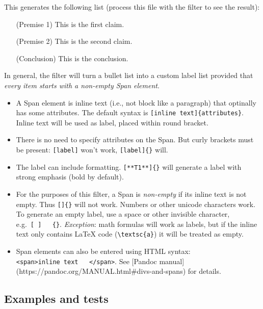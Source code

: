 This generates the following list (process this file with the filter to
see the result):

\begin{itemize}
\tightlist

\item[(Premise 1)] This is the first claim.

\item[(Premise 2)] This is the second claim.

\item[(Conclusion)] This is the conclusion.

\end{itemize}

In general, the filter will turn a bullet list into a custom label list
provided that \emph{every item starts with a non-empty Span element}.

\begin{itemize}
\tightlist
\item
  A Span element is inline text (i.e., not block like a paragraph) that
  optinally has some attributes. The default syntax is
  \texttt{{[}inline\ text{]}\{attributes\}}. Inline text will be used as
  label, placed within round bracket.
\item
  There is no need to specify attributes on the Span. But curly brackets
  must be present: \texttt{{[}label{]}} won't work,
  \texttt{{[}label{]}\{\}} will.
\item
  The label can include formatting. \texttt{{[}**T1**{]}\{\}} will
  generate a label with strong emphasis (bold by default).
\item
  For the purposes of this filter, a Span is \emph{non-empty} if its
  inline text is not empty. Thus \texttt{{[}{]}\{\}} will not work.
  Numbers or other unicode characters work. To generate an empty label,
  use a space or other invisible character,
  e.g.~\texttt{{[}\ {]}\ \ \ \{\}}. \emph{Exception}: math formulas will
  work as labels, but if the inline text only contains LaTeX code
  (\texttt{\textbackslash{}textsc\{a\}}) it will be treated as empty.
\item
  Span elements can also be entered using HTML syntax:
  \texttt{\textless{}span\textgreater{}inline\ text\ \ \ \textless{}/span\textgreater{}}.
  See {[}Pandoc manual{]}
  (https://pandoc.org/MANUAL.html\#divs-and-spans) for details.
\end{itemize}

\hypertarget{examples-and-tests}{%
\subsection{Examples and tests}\label{examples-and-tests}}


